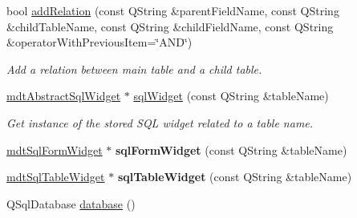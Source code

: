 \begin{DoxyCompactItemize}
bool \hyperlink{classmdt_sql_form_ab9bb1b548b71ef4e8547846b6aedec66}{addRelation} (const QString \&parentFieldName, const QString \&childTableName, const QString \&childFieldName, const QString \&operatorWithPreviousItem=\char`\"{}AND\char`\"{})
\begin{DoxyCompactList}\small\item\em Add a relation between main table and a child table. \end{DoxyCompactList}\item 
\hyperlink{classmdt_abstract_sql_widget}{mdtAbstractSqlWidget} $\ast$ \hyperlink{classmdt_sql_form_a1ea800b795e3ead97e6a0452ab305d65}{sqlWidget} (const QString \&tableName)
\begin{DoxyCompactList}\small\item\em Get instance of the stored SQL widget related to a table name. \end{DoxyCompactList}\item 
\hypertarget{classmdt_sql_form_a59dc3afec69c8b6a18ed7fccb42c70ad}{
\hyperlink{classmdt_sql_form_widget}{mdtSqlFormWidget} $\ast$ {\bfseries sqlFormWidget} (const QString \&tableName)}
\label{classmdt_sql_form_a59dc3afec69c8b6a18ed7fccb42c70ad}

\item 
\hypertarget{classmdt_sql_form_a6a17f32077fb7cc33139c3dc26a8d011}{
\hyperlink{classmdt_sql_table_widget}{mdtSqlTableWidget} $\ast$ {\bfseries sqlTableWidget} (const QString \&tableName)}
\label{classmdt_sql_form_a6a17f32077fb7cc33139c3dc26a8d011}

\item 
\hypertarget{classmdt_sql_form_ac8423f91a1f8a6fa7408cd61be86a89c}{
QSqlDatabase \hyperlink{classmdt_sql_form_ac8423f91a1f8a6fa7408cd61be86a89c}{database} ()}
\label{classmdt_sql_form_ac8423f91a1f8a6fa7408cd61be86a89c}


\end{DoxyCompactItemize}
